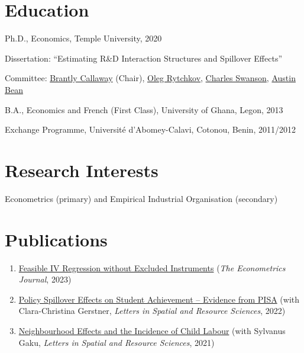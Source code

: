 \documentclass[12pt,letterpaper]{article}
\renewenvironment{itemize}{
  \begin{list}{}{
    \setlength{\leftmargin}{1.5em}
  }
}{
  \end{list}
}
\begin{document}
\section*{Education}

\begin{itemize}
  \item Ph.D., Economics, Temple University, 2020
  \begin{itemize}
    \item Dissertation: ``Estimating R\&D Interaction Structures and Spillover Effects''
    \item Committee:   \href{https://bcallaway11.github.io/index.html}
    {Brantly Callaway} (Chair), \href{https://astro.temple.edu/~rytchkov/}{Oleg Rytchkov}, \href{https://liberalarts.temple.edu/academics/faculty/swanson-charles}{Charles Swanson}, \href{https://liberalarts.temple.edu/academics/faculty/bean-austin}{Austin Bean} 
  \end{itemize}

  \item B.A., Economics and French (First Class), University of Ghana, Legon, 2013
  \item  Exchange Programme, Universit\'{e} d'Abomey-Calavi, Cotonou, Benin, 2011/2012
\end{itemize}

\section*{Research Interests}
\begin{itemize}
  \item Econometrics (primary) and Empirical Industrial Organisation (secondary)
\end{itemize}

\section*{Publications}
\begin{enumerate}
  \item \href{https://academic.oup.com/ectj/advance-article-abstract/doi/10.1093/ectj/utac032/6888009?redirectedFrom=fulltext}{Feasible IV Regression without Excluded Instruments} (\textit{The Econometrics Journal}, 2023)
  
  \item \href{https://link.springer.com/article/10.1007/s12076-022-00310-y}{Policy Spillover Effects on Student Achievement – Evidence from PISA} (with Clara-Christina Gerstner, \textit{Letters in Spatial and Resource Sciences}, 2022) 
  
	\item \href{https://link.springer.com/article/10.1007/s12076-021-00276-3}{Neighbourhood Effects and the Incidence of Child Labour} (with Sylvanus Gaku, \textit{Letters in Spatial and Resource Sciences}, 2021)
\end{enumerate}
\end{document}
